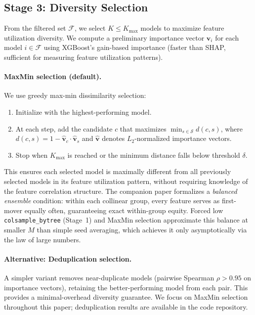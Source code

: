 \documentclass[11pt]{article}
\newcommand{\rhovar}{\rho}
\begin{document}
\subsection{Stage 3: Diversity Selection}

From the filtered set $\mathcal{F}$, we select $K \leq K_{\max}$
models to maximize feature utilization diversity. We compute a
preliminary importance vector $\mathbf{v}_i$ for each model $i \in
\mathcal{F}$ using XGBoost's gain-based importance (faster than SHAP,
sufficient for measuring feature utilization patterns).

\paragraph{MaxMin selection (default).}
We use greedy max-min dissimilarity selection:
\begin{enumerate}
  \item Initialize with the highest-performing model.
  \item At each step, add the candidate $c$ that maximizes
    $\min_{s \in \mathcal{S}} d(c, s)$, where
    $d(c, s) = 1 - \hat{\mathbf{v}}_c \cdot \hat{\mathbf{v}}_s$
    and $\hat{\mathbf{v}}$ denotes $L_2$-normalized importance vectors.
  \item Stop when $K_{\max}$ is reached or the minimum distance falls
    below threshold $\delta$.
\end{enumerate}

This ensures each selected model is maximally different from all previously
selected models in its feature utilization pattern, without requiring
knowledge of the feature correlation structure.
The companion paper \citep{caraker2026impossibility} formalizes a
\emph{balanced ensemble} condition: within each collinear group, every
feature serves as first-mover equally often, guaranteeing exact
within-group equity.  Forced low \texttt{colsample\_bytree} (Stage~1)
and MaxMin selection approximate this balance at smaller $M$ than
simple seed averaging, which achieves it only asymptotically via the
law of large numbers.

\paragraph{Alternative: Deduplication selection.}
A simpler variant removes near-duplicate models (pairwise Spearman
$\rhovar > 0.95$ on importance vectors), retaining the better-performing
model from each pair. This provides a minimal-overhead diversity guarantee.
We focus on MaxMin selection throughout this paper; deduplication results
are available in the code repository.
\end{document}

